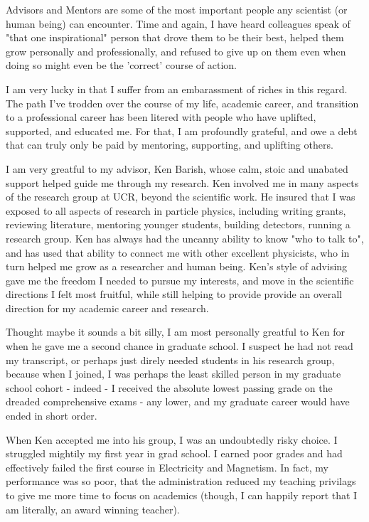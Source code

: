 Advisors and Mentors are some of the most important people any scientist (or
human being) can encounter. Time and again, I have heard colleagues speak of
"that one inspirational" person that drove them to be their best, helped them
grow personally and professionally, and refused to give up on them even when
doing so might even be the 'correct' course of action.

I am very lucky in that I suffer from an embarassment of riches in this regard.
The path I've trodden over the course of my life, academic career, and
transition to a professional career has been litered with people who have
uplifted, supported, and educated me. For that, I am profoundly grateful, and
owe a debt that can truly only be paid by mentoring, supporting, and uplifting
others.

I am very greatful to my advisor, Ken Barish, whose calm, stoic and unabated
support helped guide me through my research. Ken involved me in many aspects of
the research group at UCR, beyond the scientific work. He insured that I was
exposed to all aspects of research in particle physics, including writing
grants, reviewing literature, mentoring younger students, building detectors,
running a research group.  Ken has always had the uncanny ability to know "who
to talk to", and has used that ability to connect me with other excellent
physicists, who in turn helped me grow as a researcher and human being. Ken's
style of advising gave me the freedom I needed to pursue my interests, and move
in the scientific directions I felt most fruitful, while still helping to
provide provide an overall direction for my academic career and research. 

Thought maybe it sounds a bit silly, I am most personally greatful to Ken for
when he gave me a second chance in graduate school. I suspect he had not read
my transcript, or perhaps just direly needed students in his research group,
because when I joined, I was perhaps the least skilled person in my graduate
school cohort - indeed - I received the absolute lowest passing grade on the
dreaded comprehensive exams - any lower, and my graduate career would have
ended in short order.

When Ken accepted me into his group, I was an undoubtedly risky choice. I
struggled mightily my first year in grad school.  I earned poor grades and had
effectively failed the first course in Electricity and Magnetism. In fact, my
performance was so poor, that the administration reduced my teaching
privilags to give me more time to focus on academics (though, I can happily
report that I am literally, an award winning teacher).

